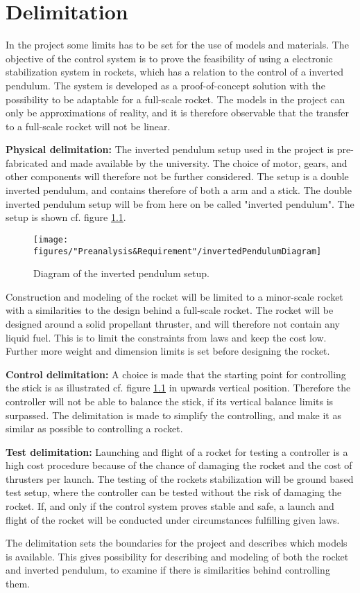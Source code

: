 \chapter{Delimitation}
In the project some limits has to be set for the use of models and materials. The objective of the control system is to prove the feasibility of using a electronic stabilization system in rockets, which has a relation to the control of a inverted pendulum. The system is developed as a proof-of-concept solution with the possibility to be adaptable for a full-scale rocket. The models in the project can only be approximations of reality, and it is therefore observable that the transfer to a full-scale rocket will not be linear.        

\textbf{Physical delimitation:}
The inverted pendulum setup used in the project is pre-fabricated and made available by the university.  The choice of motor, gears, and other components will therefore not be further considered. The setup is a double inverted pendulum, and contains therefore of both a arm and a stick. The double inverted pendulum setup will be from here on be called "inverted pendulum". The setup is shown cf. figure \ref{fig:InvertedPendulum1}.
\begin{figure}[htbp]
	\centering
	\texttt{[image: figures/"Preanalysis\&Requirement"/invertedPendulumDiagram]}
	\caption{Diagram of the inverted pendulum setup\citep{web:BalancingStick2008}.} \label{fig:InvertedPendulum1}
\end{figure}


Construction and modeling of the rocket will be limited to a minor-scale rocket with a similarities to the design behind a full-scale rocket. The rocket will be designed around a solid propellant thruster, and will therefore not contain any liquid fuel. This is to limit the constraints from laws and keep the cost low. Further more weight and dimension limits is set before designing the rocket.
 
 
\textbf{Control delimitation:}
A choice is made that the starting point for controlling the stick is as illustrated cf. figure \ref{fig:InvertedPendulum1} in upwards vertical position. Therefore the controller will not be able to balance the stick, if its vertical balance limits is surpassed. The delimitation is made to simplify the controlling, and make it as similar as possible to controlling a rocket. 
 
 
\textbf{Test delimitation:}
Launching and flight of a rocket for testing a controller is a high cost procedure because of the chance of damaging the rocket and the cost of thrusters per launch. The testing of the rockets stabilization will be ground based test setup, where the controller can be tested without the risk of damaging the rocket. If, and only if the control system proves stable and safe, a launch and flight of the rocket will be conducted under circumstances fulfilling given laws.   
\bigbreak


The delimitation sets the boundaries for the project and describes which models is available. This gives possibility for describing and modeling of both the rocket and inverted pendulum, to examine if there is similarities behind controlling them. 